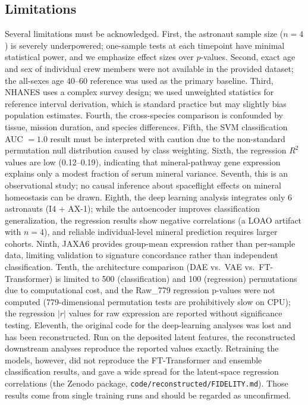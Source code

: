 \documentclass[11pt,a4paper]{article}
\begin{document}
\subsection{Limitations}

Several limitations must be acknowledged. First, the astronaut sample size ($n = 4$) is severely underpowered; one-sample tests at each timepoint have minimal statistical power, and we emphasize effect sizes over $p$-values. Second, exact age and sex of individual crew members were not available in the provided dataset; the all-sexes age 40--60 reference was used as the primary baseline. Third, NHANES uses a complex survey design; we used unweighted statistics for reference interval derivation, which is standard practice but may slightly bias population estimates. Fourth, the cross-species comparison is confounded by tissue, mission duration, and species differences. Fifth, the SVM classification AUC $= 1.0$ result must be interpreted with caution due to the non-standard permutation null distribution caused by class weighting. Sixth, the regression $R^2$ values are low (0.12--0.19), indicating that mineral-pathway gene expression explains only a modest fraction of serum mineral variance. Seventh, this is an observational study; no causal inference about spaceflight effects on mineral homeostasis can be drawn. Eighth, the deep learning analysis integrates only 6 astronauts (I4 + AX-1); while the autoencoder improves classification generalization, the regression results show negative correlations (a LOAO artifact with $n = 4$), and reliable individual-level mineral prediction requires larger cohorts. Ninth, JAXA6 provides group-mean expression rather than per-sample data, limiting validation to signature concordance rather than independent classification. Tenth, the architecture comparison (DAE vs.\ VAE vs.\ FT-Transformer) is limited to 500 (classification) and 100 (regression) permutations due to computational cost, and the Raw\_779 regression p-values were not computed (779-dimensional permutation tests are prohibitively slow on CPU); the regression $|r|$ values for raw expression are reported without significance testing. Eleventh, the original code for the deep-learning analyses was lost and has been reconstructed. Run on the deposited latent features, the reconstructed downstream analyses reproduce the reported values exactly. Retraining the models, however, did not reproduce the FT-Transformer and ensemble classification results, and gave a wide spread for the latent-space regression correlations (the Zenodo package, \texttt{code/reconstructed/FIDELITY.md}). Those results come from single training runs and should be regarded as unconfirmed.
\end{document}
